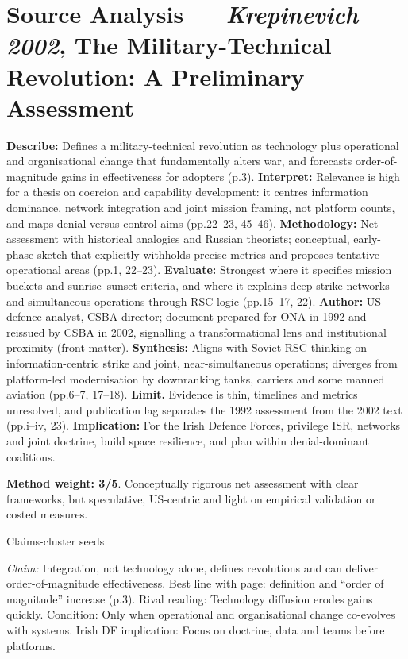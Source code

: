 \section*{Source Analysis — \textit{Krepinevich 2002}, The Military-Technical Revolution: A Preliminary Assessment}
\textbf{Describe:} Defines a military-technical revolution as technology plus operational and organisational change that fundamentally alters war, and forecasts order-of-magnitude gains in effectiveness for adopters (p.3).
\textbf{Interpret:} Relevance is high for a thesis on coercion and capability development: it centres information dominance, network integration and joint mission framing, not platform counts, and maps denial versus control aims (pp.22–23, 45–46).
\textbf{Methodology:} Net assessment with historical analogies and Russian theorists; conceptual, early-phase sketch that explicitly withholds precise metrics and proposes tentative operational areas (pp.1, 22–23).
\textbf{Evaluate:} Strongest where it specifies mission buckets and sunrise–sunset criteria, and where it explains deep-strike networks and simultaneous operations through RSC logic (pp.15–17, 22).
\textbf{Author:} US defence analyst, CSBA director; document prepared for ONA in 1992 and reissued by CSBA in 2002, signalling a transformational lens and institutional proximity (front matter).
\textbf{Synthesis:} Aligns with Soviet RSC thinking on information-centric strike and joint, near-simultaneous operations; diverges from platform-led modernisation by downranking tanks, carriers and some manned aviation (pp.6–7, 17–18).
\textbf{Limit.} Evidence is thin, timelines and metrics unresolved, and publication lag separates the 1992 assessment from the 2002 text (pp.i–iv, 23).
\textbf{Implication:} For the Irish Defence Forces, privilege ISR, networks and joint doctrine, build space resilience, and plan within denial-dominant coalitions.

\textbf{Method weight: 3/5}. Conceptually rigorous net assessment with clear frameworks, but speculative, US-centric and light on empirical validation or costed measures.

Claims-cluster seeds

\textit{Claim:} Integration, not technology alone, defines revolutions and can deliver order-of-magnitude effectiveness.
Best line with page: definition and “order of magnitude” increase (p.3). Rival reading: Technology diffusion erodes gains quickly. Condition: Only when operational and organisational change co-evolves with systems. Irish DF implication: Focus on doctrine, data and teams before platforms.

